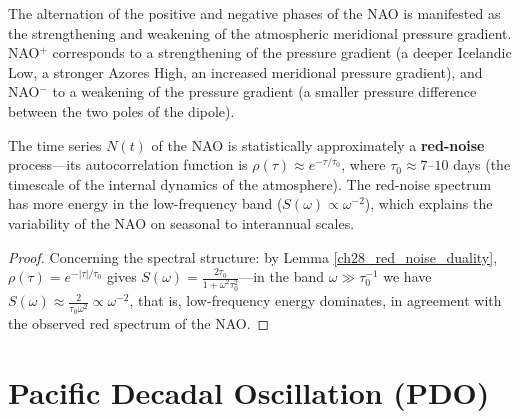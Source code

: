 \begin{proposition}\label{prop:nao_divergence}
The alternation of the positive and negative phases of the NAO is manifested as the strengthening and weakening of the atmospheric meridional pressure gradient. NAO$^+$ corresponds to a strengthening of the pressure gradient (a deeper Icelandic Low, a stronger Azores High, an increased meridional pressure gradient), and NAO$^-$ to a weakening of the pressure gradient (a smaller pressure difference between the two poles of the dipole).

The time series $N(t)$ of the NAO is statistically approximately a \textbf{red-noise} process---its autocorrelation function is $\rho(\tau) \approx e^{-\tau/\tau_0}$, where $\tau_0 \approx 7$--$10$ days (the timescale of the internal dynamics of the atmosphere). The red-noise spectrum has more energy in the low-frequency band ($S(\omega) \propto \omega^{-2}$), which explains the variability of the NAO on seasonal to interannual scales.
\end{proposition}

\begin{proof}
Concerning the spectral structure: by Lemma \ref{ch28_red_noise_duality}, $\rho(\tau) = e^{-|\tau|/\tau_0}$ gives $S(\omega) = \frac{2\tau_0}{1+\omega^2\tau_0^2}$---in the band $\omega \gg \tau_0^{-1}$ we have $S(\omega) \approx \frac{2}{\tau_0\omega^2} \propto \omega^{-2}$, that is, low-frequency energy dominates, in agreement with the observed red spectrum of the NAO.
\end{proof}

\section{Pacific Decadal Oscillation (PDO)}

